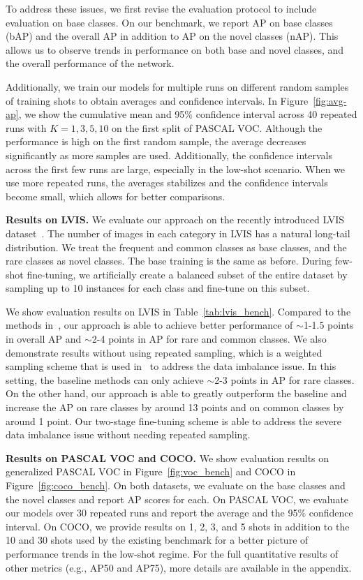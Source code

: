 \documentclass{article}
\newcommand\minisection[1]{\vspace{1mm}\noindent \textbf{#1}}
\begin{document}
To address these issues, we first revise the evaluation protocol to include evaluation on base classes. On our benchmark, we report AP on base classes (bAP) and the overall AP in addition to AP on the novel classes (nAP). This allows us to observe trends in performance on both base and novel classes, and the overall performance of the network.

Additionally, we train our models for multiple runs on different random samples of training shots to obtain averages and confidence intervals.
In Figure~\ref{fig:avg-ap}, we show the cumulative mean and 95\% confidence interval across 40 repeated runs with $K=1,3,5,10$ on the first split of PASCAL VOC.
Although the performance is high on the first random sample, the average decreases significantly as more samples are used.
Additionally, the confidence intervals across the first few runs are large, especially in the low-shot scenario.
When we use more repeated runs, the averages stabilizes and the confidence intervals become small, which allows for better comparisons.



\minisection{Results on LVIS.}
We evaluate our approach on the recently introduced LVIS dataset~\cite{gupta2019lvis}. The number of images in each category in LVIS has a natural long-tail distribution. We treat the frequent and common classes as base classes, and the rare classes as novel classes.
The base training is the same as before.
During few-shot fine-tuning, we artificially create a balanced subset of the entire dataset by sampling up to 10 instances for each class and fine-tune on this subset.

We show evaluation results on LVIS in Table~\ref{tab:lvis_bench}.
Compared to the methods in~\citet{gupta2019lvis}, our approach is able to achieve better performance of $\sim$1-1.5 points in overall AP and $\sim$2-4 points in AP for rare and common classes.
We also demonstrate results without using repeated sampling, which is a weighted sampling scheme that is used in~\citet{gupta2019lvis} to address the data imbalance issue.
In this setting, the baseline methods can only achieve $\sim$2-3 points in AP for rare classes.
On the other hand, our approach is able to greatly outperform the baseline and increase the AP on rare classes by around 13 points and on common classes by around 1 point.
Our two-stage fine-tuning scheme is able to address the severe data imbalance issue without needing repeated sampling.

\vspace{3mm}
\minisection{Results on PASCAL VOC and COCO.}
We show evaluation results on generalized PASCAL VOC in Figure~\ref{fig:voc_bench} and COCO in Figure~\ref{fig:coco_bench}.
On both datasets, we evaluate on the base classes and the novel classes and report AP scores for each.
On PASCAL VOC, we evaluate our models over 30 repeated runs and report the average and the 95\% confidence interval.
On COCO, we provide results on 1, 2, 3, and 5 shots in addition to the 10 and 30 shots used by the existing benchmark for a better picture of performance trends in the low-shot regime. For the full quantitative results of other metrics (e.g., AP50 and AP75), more details are available in the appendix.
\end{document}
